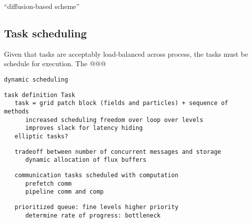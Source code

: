 \documentclass[10pt]{article}
\begin{document}

``diffusion-based scheme''

% 



\subsection{Task scheduling} \label{ss:design-schedule}

Given that tasks are acceptably load-balanced across process, the
tasks must be schedule for execution.  The @@@

\begin{verbatim}
dynamic scheduling
\end{verbatim}

\begin{verbatim}
task definition Task
   task = grid patch block (fields and particles) + sequence of methods
      increased scheduling freedom over loop over levels
      improves slack for latency hiding
   elliptic tasks?
\end{verbatim}

\begin{verbatim}
   tradeoff between number of concurrent messages and storage
      dynamic allocation of flux buffers
\end{verbatim}

\begin{verbatim}
   communication tasks scheduled with computation
      prefetch comm
      pipeline comm and comp
\end{verbatim}

\begin{verbatim}
   prioritized queue: fine levels higher priority
      determine rate of progress: bottleneck
\end{verbatim}
\end{document}
